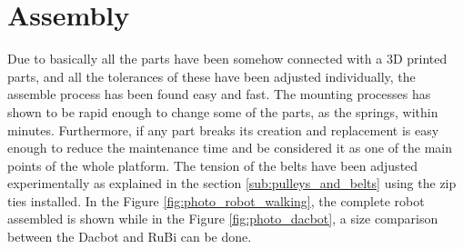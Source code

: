 \section{Assembly} %
\label{sec:assembly}
Due to basically all the parts have been somehow connected with a 3D printed parts, and all the tolerances of these have been adjusted individually, the assemble process has been found easy and fast.
The mounting processes has shown to be rapid enough to change some of the parts, as the springs, within minutes.
Furthermore, if any part breaks its creation and replacement is easy enough to reduce the maintenance time and be considered it as one of the main points of the whole platform.
The tension of the belts have been adjusted experimentally as explained in the section \ref{sub:pulleys_and_belts} using the zip ties installed.
In the Figure \ref{fig:photo_robot_walking}, the complete robot assembled is shown while in the Figure \ref{fig:photo_dacbot}, a size comparison between the Dacbot \cite{dacbot1} and RuBi can be done.

